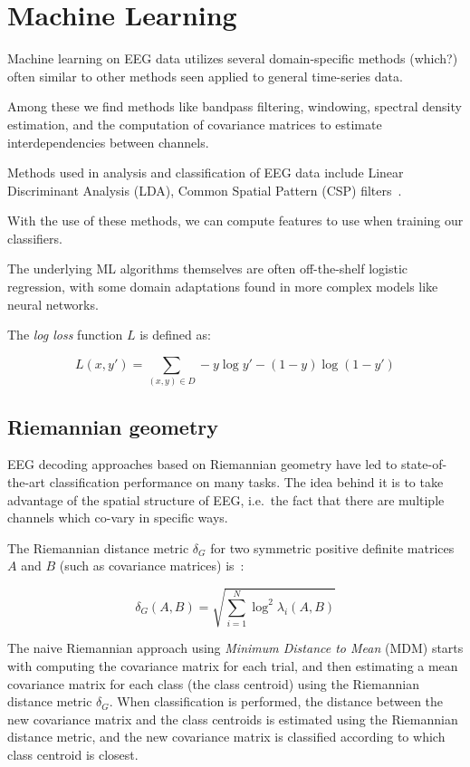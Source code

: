 \section{Machine Learning}

    Machine learning on EEG data utilizes several domain-specific methods (which?) often similar to other methods seen applied to general time-series data.

    Among these we find methods like bandpass filtering, windowing, spectral density estimation, and the computation of covariance matrices to estimate interdependencies between channels.

    Methods used in analysis and classification of EEG data include Linear Discriminant Analysis (LDA), Common Spatial Pattern (CSP) filters~\cite{barachant_common_2010}.

    With the use of these methods, we can compute features to use when training our classifiers.

    The underlying ML algorithms themselves are often off-the-shelf logistic regression, with some domain adaptations found in more complex models like neural networks.

    The \emph{log loss} function $L$ is defined as:

    \[ L(x, y') = \sum_{(x,y) \in D} -y \log y' - (1 - y) \log(1 - y')\]

    \subsection{Riemannian geometry}\label{section:riemannian-theory}


        EEG decoding approaches based on Riemannian geometry have led to state-of-the-art classification performance on many tasks. The idea behind it is to take advantage of the spatial structure of EEG, i.e.\ the fact that there are multiple channels which co-vary in specific ways.

        The Riemannian distance metric $\delta_G$ for two symmetric positive definite matrices $A$ and $B$ (such as covariance matrices) is~\cite{grafarend_metric_2003}:

        \[ \delta_G(A, B) = \sqrt{\sum_{i=1}^N \log^2 \lambda_i (A, B) } \]

        The naive Riemannian approach using \emph{Minimum Distance to Mean} (MDM) starts with computing the covariance matrix for each trial, and then estimating a mean covariance matrix for each class (the class centroid) using the Riemannian distance metric $\delta_G$. When classification is performed, the distance between the new covariance matrix and the class centroids is estimated using the Riemannian distance metric, and the new covariance matrix is classified according to which class centroid is closest.

